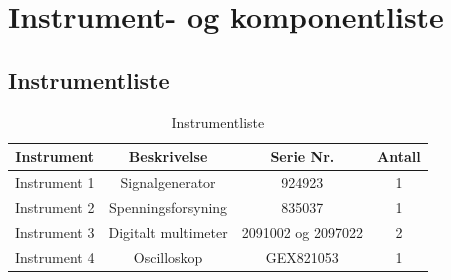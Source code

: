 \section{Instrument- og komponentliste}

    \subsection{Instrumentliste}
        \begin{table}[h]
            \centering
            \caption{Instrumentliste}
            \label{tab:instrumentliste}
            \begin{tabular}{|c|c|c|c|}
                \hline
                \rowcolor[gray]{0.9}
                \textbf{Instrument} & \textbf{Beskrivelse} & \textbf{Serie Nr.} & \textbf{Antall} \\ \hline
                Instrument 1 & Signalgenerator          & 924923 & 1 \\ \hline
                Instrument 2 & Spenningsforsyning          & 835037 & 1 \\ \hline
                Instrument 3 & Digitalt multimeter  & 2091002 og 2097022 & 2 \\ \hline
                Instrument 4 & Oscilloskop          & GEX821053 & 1 \\ \hline
            \end{tabular}
        \end{table}

